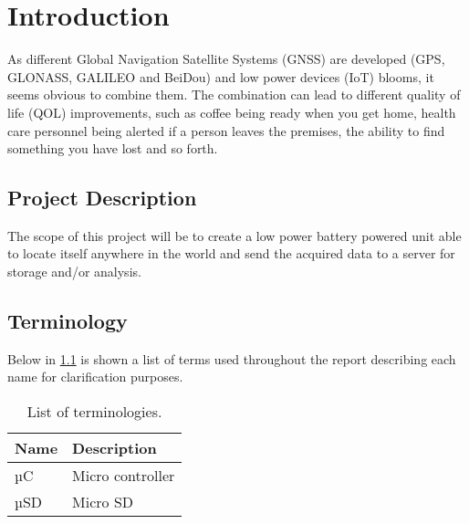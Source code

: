 
\chapter{Introduction}
\label{sec:introduction}
As different Global Navigation Satellite Systems (GNSS) are developed (GPS, GLONASS, GALILEO and BeiDou) and low power devices (IoT) blooms, it seems obvious to combine them.
The combination can lead to different quality of life (QOL) improvements, such as coffee being ready when you get home, health care personnel being alerted if a person leaves the premises, the ability to find something you have lost and so forth.

\section{Project Description}
\label{sec:projectDescription}
The scope of this project will be to create a low power battery powered unit able to locate itself anywhere in the world and send the acquired data to a server for storage and/or analysis.

\section{Terminology}
\label{sec:terminology}
Below in \cref{tab:terminology} is shown a list of terms used throughout the report describing each name for clarification purposes.

\begin{table}[H]
	\centering
	\begin{tabular}{l l}
		\toprule
		\textbf{Name} & \textbf{Description} \\
		\midrule
		µC & Micro controller \\
		µSD & Micro SD \\
		\bottomrule
	\end{tabular}
	\caption{List of terminologies.}
	\label{tab:terminology}
\end{table}
